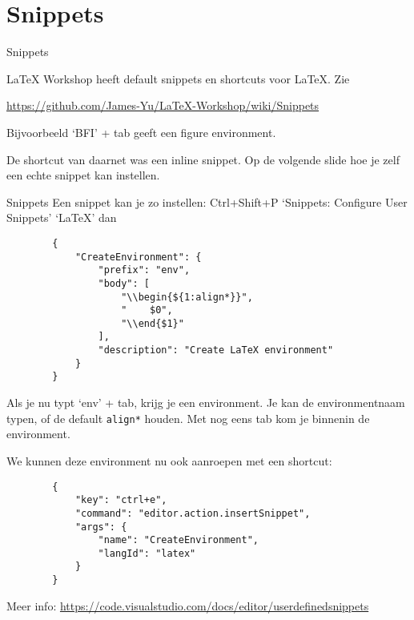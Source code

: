 \documentclass[
    dutch,
    everyoneauthor=true,
    darktheme,
    defaultSlideCollection=vincent,
    handout
]{../../cursuspresentatie}
\let\placetarget\relax
\let\placetarget\relax
\begin{document}
\section{Snippets}

\def\placetarget{\hypertarget{snippets}{}}

\begin{frame}[fragile]{Snippets}
    \begin{center}
        LaTeX Workshop heeft default snippets en shortcuts voor LaTeX. Zie

        \url{https://github.com/James-Yu/LaTeX-Workshop/wiki/Snippets}
    
        Bijvoorbeeld `BFI' + tab geeft een figure environment.
    
        De shortcut van daarnet was een inline snippet. 
        Op de volgende slide hoe je zelf een echte snippet kan instellen.
    \end{center}
\end{frame}


\begin{frame}[fragile]{Snippets}
    Een snippet kan je zo instellen:
    Ctrl+Shift+P \textrightarrow{} `Snippets: Configure User Snippets' \textrightarrow{} `LaTeX' dan
    \begin{verbatim}
        {
            "CreateEnvironment": {
                "prefix": "env",
                "body": [
                    "\\begin{${1:align*}}",
                    "    $0",
                    "\\end{$1}"
                ],
                "description": "Create LaTeX environment"
            }
        }
    \end{verbatim}

    Als je nu typt `env' + tab, krijg je een environment. Je kan de environmentnaam typen, of de
    default \texttt{align*} houden. Met nog eens tab kom je binnenin de environment.
\end{frame}

\begin{frame}[fragile]
    We kunnen deze environment nu ook aanroepen met een shortcut:
    \begin{verbatim}
        {
            "key": "ctrl+e",
            "command": "editor.action.insertSnippet",
            "args": {
                "name": "CreateEnvironment",
                "langId": "latex"
            }
        }
    \end{verbatim}

    Meer info: \url{https://code.visualstudio.com/docs/editor/userdefinedsnippets}
\end{frame}
\end{document}

